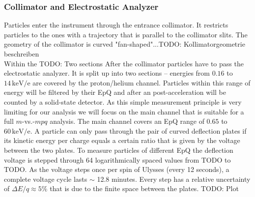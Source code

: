 \subsubsection{Collimator and Electrostatic Analyzer}
\label{sec:EpQ}
Particles enter the instrument through the entrance collimator. It restricts particles to the ones with a trajectory that is parallel to the collimator slits. The geometry of the collimator is curved "fan-shaped"...TODO: Kollimatorgeometrie beschreiben \\
Within the TODO: Two sections
After the collimator particles have to pass the electrostatic analyzer. It is split up into two sections -- energies from $0.16$ to $14\,\mathrm{keV/e}$ are covered by the proton/helium channel. Particles within this range of energy will be filtered by their EpQ and after an post-acceleration will be counted by a solid-state detector. 
As this simple measurement principle is very limiting for our analysis we will focus on the main channel that is suitable for a full $m$-vs.-$mpq$ analysis.
The main channel covers an EpQ range of $0.65$ to $60\,\mathrm{keV/e}$. A particle can only pass through the pair of curved deflection plates if its kinetic energy per charge equals a certain ratio that is given by the voltage between the two plates. To measure particles of different EpQ the deflection voltage is stepped through 64 logarithmically spaced values from TODO to TODO. As the voltage steps once per spin of Ulysses (every 12 seconds), a complete voltage cycle lasts $\sim$ 12.8 minutes. 
Every step has a relative uncertainty of $\Delta E/q \approx 5\%$ that is due to the finite space between the plates. TODO: Plot
